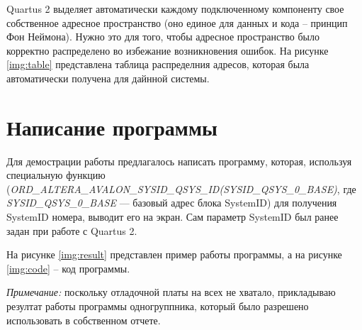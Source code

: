 
Quartus 2 выделяет автоматически каждому подключенному компоненту свое собственное адресное пространство (оно единое для данных и кода -- принцип Фон Неймона). Нужно это для того, чтобы адресное пространство было корректно распределено во избежание возникновения ошибок.
На рисунке \ref{img:table} представлена таблица распределния адресов, которая была автоматически получена для дайнной системы.


\clearpage

\section{Написание программы}

Для демострации работы предлагалось написать программу, которая, используя специальную функцию (\textit{ORD\_ALTERA\_AVALON\_SYSID\_QSYS\_ID(SYSID\_QSYS\_0\_BASE)}, где \textit{ SYSID\_QSYS\_0\_BASE} — базовый адрес блока SystemID) для получения SystemID номера, выводит его на экран. Сам параметр SystemID был ранее задан при работе с Quartus 2.

На рисунке \ref{img:result} представлен пример работы программы, а на рисунке \ref{img:code} -- код программы.

\textit{Примечание:} поскольку отладочной платы на всех не хватало, прикладываю резултат работы программы одногруппника, который было разрешено использовать в собственном отчете.

